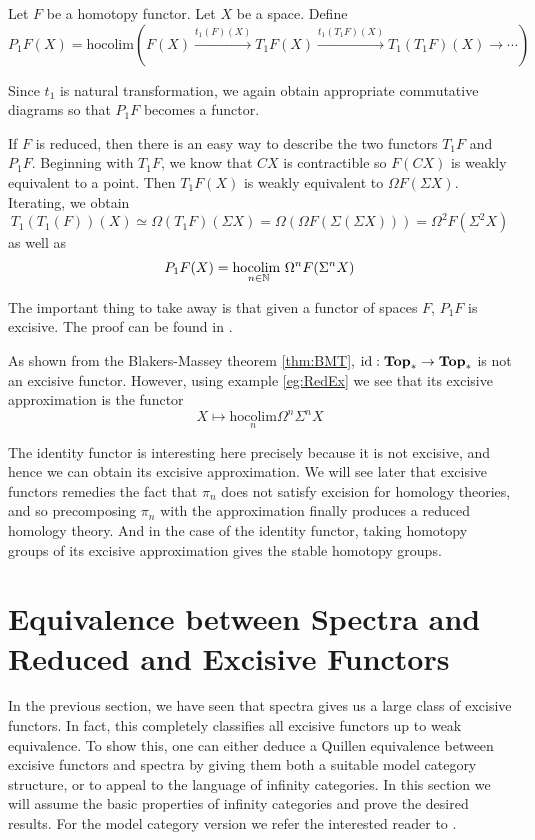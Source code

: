 \begin{defn}\label{defn:P1} Let $F$ be a homotopy functor. Let $X$ be a space. Define $$P_1F(X)=\text{hocolim}(F(X)\overset{t_1(F)(X)}{\rightarrow}T_1F(X)\overset{t_1(T_1F)(X)}{\rightarrow}T_1(T_1F)(X)\rightarrow\cdots)$$
\end{defn}

Since $t_1$ is natural transformation, we again obtain appropriate commutative diagrams so that $P_1F$ becomes a functor. 

\begin{eg}\label{eg:RedEx} If $F$ is reduced, then there is an easy way to describe the two functors $T_1F$ and $P_1F$. Beginning with $T_1F$, we know that $CX$ is contractible so $F(CX)$ is weakly equivalent to a point. Then $T_1F(X)$ is weakly equivalent to $\Omega F(\Sigma X)$. Iterating, we obtain $$T_1(T_1(F))(X)\simeq\Omega (T_1F)(\Sigma X)=\Omega(\Omega F(\Sigma(\Sigma X)))=\Omega^2 F(\Sigma^2 X)$$ as well as $$P_1F(X)=\underset{n\in\mathbb{N}}{\text{hocolim }}\Omega^n F(\Sigma^n X)$$
\end{eg}

The important thing to take away is that given a functor of spaces $F$, $P_1F$ is excisive. The proof can be found in \cite{GW3}. 

\begin{eg}\label{eg:ExcApproxId} As shown from the Blakers-Massey theorem \ref{thm:BMT}, $\text{id}:\bold{Top}_\ast\to\bold{Top}_\ast$ is not an excisive functor. However, using example \ref{eg:RedEx} we see that its excisive approximation is the functor $$X\mapsto\underset{n}{\text{hocolim}}\Omega^n\Sigma^n X$$
\end{eg}

The identity functor is interesting here precisely because it is not excisive, and hence we can obtain its excisive approximation. We will see later that excisive functors remedies the fact that $\pi_n$ does not satisfy excision for homology theories, and so precomposing $\pi_n$ with the approximation finally produces a reduced homology theory. And in the case of the identity functor, taking homotopy groups of its excisive approximation gives the stable homotopy groups. 

\section{Equivalence between Spectra and Reduced and Excisive Functors}
In the previous section, we have seen that spectra gives us a large class of excisive functors. In fact, this completely classifies all excisive functors up to weak equivalence. To show this, one can either deduce a Quillen equivalence between excisive functors and spectra by giving them both a suitable model category structure, or to appeal to the language of infinity categories. In this section we will assume the basic properties of infinity categories and prove the desired results. For the model category version we refer the interested reader to \cite{Biedermann_2007}. 


